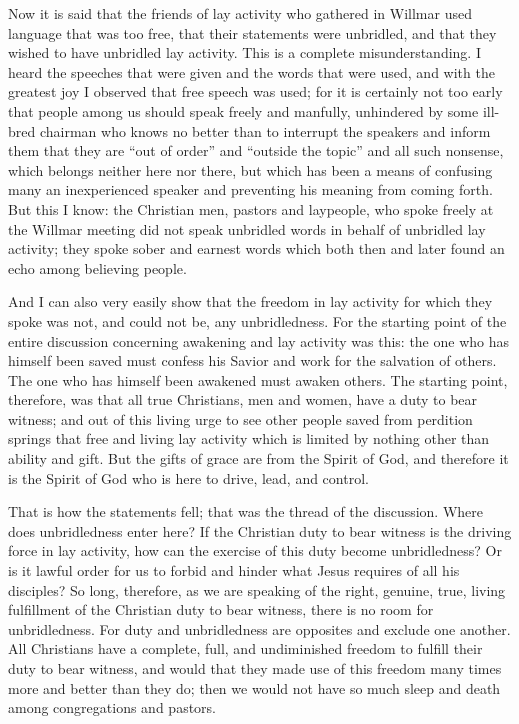 Now it is said that the friends of lay activity who gathered in Willmar used language that was too free, that their statements were unbridled, and that they wished to have unbridled lay activity. This is a complete misunderstanding. I heard the speeches that were given and the words that were used, and with the greatest joy I observed that free speech was used; for it is certainly not too early that people among us should speak freely and manfully, unhindered by some ill-bred chairman who knows no better than to interrupt the speakers and inform them that they are “out of order” and “outside the topic” and all such nonsense, which belongs neither here nor there, but which has been a means of confusing many an inexperienced speaker and preventing his meaning from coming forth. But this I know: the Christian men, pastors and laypeople, who spoke freely at the Willmar meeting did not speak unbridled words in behalf of unbridled lay activity; they spoke sober and earnest words which both then and later found an echo among believing people.

And I can also very easily show that the freedom in lay activity for which they spoke was not, and could not be, any unbridledness. For the starting point of the entire discussion concerning awakening and lay activity was this: the one who has himself been saved must confess his Savior and work for the salvation of others. The one who has himself been awakened must awaken others. The starting point, therefore, was that all true Christians, men and women, have a duty to bear witness; and out of this living urge to see other people saved from perdition springs that free and living lay activity which is limited by nothing other than ability and gift. But the gifts of grace are from the Spirit of God, and therefore it is the Spirit of God who is here to drive, lead, and control.

That is how the statements fell; that was the thread of the discussion. Where does unbridledness enter here? If the Christian duty to bear witness is the driving force in lay activity, how can the exercise of this duty become unbridledness? Or is it lawful order for us to forbid and hinder what Jesus requires of all his disciples? So long, therefore, as we are speaking of the right, genuine, true, living fulfillment of the Christian duty to bear witness, there is no room for unbridledness. For duty and unbridledness are opposites and exclude one another. All Christians have a complete, full, and undiminished freedom to fulfill their duty to bear witness, and would that they made use of this freedom many times more and better than they do; then we would not have so much sleep and death among congregations and pastors.

